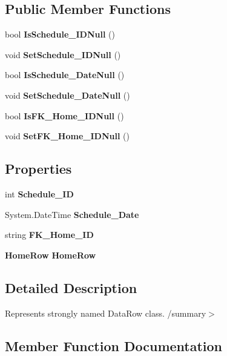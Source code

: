 \subsection*{Public Member Functions}
\begin{DoxyCompactItemize}
\item 
bool \textbf{ Is\+Schedule\+\_\+\+I\+D\+Null} ()
\item 
void \textbf{ Set\+Schedule\+\_\+\+I\+D\+Null} ()
\item 
bool \textbf{ Is\+Schedule\+\_\+\+Date\+Null} ()
\item 
void \textbf{ Set\+Schedule\+\_\+\+Date\+Null} ()
\item 
bool \textbf{ Is\+F\+K\+\_\+\+Home\+\_\+\+I\+D\+Null} ()
\item 
void \textbf{ Set\+F\+K\+\_\+\+Home\+\_\+\+I\+D\+Null} ()
\end{DoxyCompactItemize}
\subsection*{Properties}
\begin{DoxyCompactItemize}
\item 
int \textbf{ Schedule\+\_\+\+ID}\hspace{0.3cm}{\ttfamily  [get, set]}
\item 
System.\+Date\+Time \textbf{ Schedule\+\_\+\+Date}\hspace{0.3cm}{\ttfamily  [get, set]}
\item 
string \textbf{ F\+K\+\_\+\+Home\+\_\+\+ID}\hspace{0.3cm}{\ttfamily  [get, set]}
\item 
\textbf{ Home\+Row} \textbf{ Home\+Row}\hspace{0.3cm}{\ttfamily  [get, set]}
\end{DoxyCompactItemize}


\subsection{Detailed Description}
Represents strongly named Data\+Row class. /summary$>$ 

\subsection{Member Function Documentation}
\mbox{\label{class_a_f_h___scheduler_1_1_home_inspection_db_data_set_1_1_inspection___schedule_row_a36580d4acb13e9b73bff0778526825d6}} 
